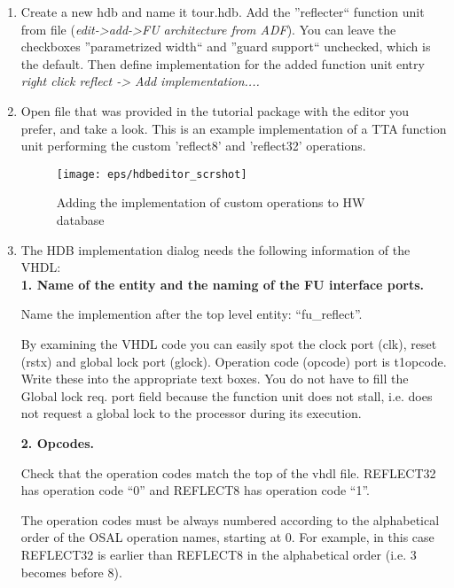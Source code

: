 \documentclass[twoside]{tceusermanual}
\begin{document}
\begin{enumerate}
 \item%
 Create a new hdb and name it tour.hdb. Add the ''reflecter``
 function unit from  file (\textit{edit->add->FU
 architecture from ADF}).  You can leave the checkboxes ''parametrized
 width`` and ''guard support`` unchecked, which is the default.  Then
 define implementation for the added function unit entry \textit{right
 click reflect -> Add implementation....}\\

\item%
Open file  that was provided in the tutorial
package with the editor  you prefer, and take a look. This is an example
implementation of a TTA function unit performing the custom 'reflect8'
and 'reflect32' operations.

\begin{figure}
  \begin{center} \texttt{[image: eps/hdbeditor\_scrshot]}
  \caption{Adding the implementation of custom operations to HW database}
  \label{fig:hdbed} \end{center}
\end{figure}

\item%
The HDB implementation dialog needs the following information of the VHDL:\\

\textbf{1. Name of the entity and the naming of the FU interface ports.}

Name the implemention after the top level entity: ``fu\_reflect''.

By examining the VHDL code you can easily spot the clock port (clk),
reset (rstx) and global lock port (glock). Operation code (opcode)
port is t1opcode. Write these into the appropriate text boxes. You do
not have to fill the Global lock req. port field because the function
unit does not stall, i.e. does not request a global lock to the
processor during its execution.

\textbf{2. Opcodes.}

Check that the operation codes match the top of the vhdl file. REFLECT32
has operation code ``0'' and REFLECT8 has operation code ``1''. 

The operation codes must be always numbered according to the alphabetical order of 
the OSAL operation names, starting at 0. For example, in this case REFLECT32 is 
earlier than REFLECT8 in the alphabetical order (i.e. 3 becomes before 8).


\end{enumerate}
\end{document}
